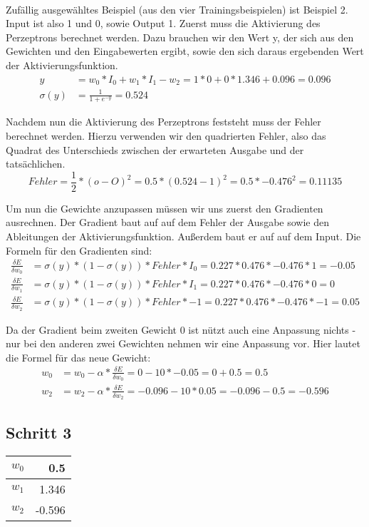 \documentclass[a4paper]{article}
\begin{document}
\paragraph{}
Zufällig ausgewähltes Beispiel (aus den vier Trainingsbeispielen) ist Beispiel 2. Input ist also 1 und 0, sowie Output 1.
Zuerst muss die Aktivierung des Perzeptrons berechnet werden. Dazu brauchen wir den Wert y, der sich aus den Gewichten und den Eingabewerten ergibt, sowie den sich daraus ergebenden Wert der Aktivierungsfunktion.
\begin{align*}
	y &= w_0 * I_0 + w_1 * I_1 - w_2 = 1 * 0 + 0 * 1.346 + 0.096 = 0.096 \\
	\sigma(y) &= \frac{1}{1 + e^{-y}} = 0.524
\end{align*}

Nachdem nun die Aktivierung des Perzeptrons feststeht muss der Fehler berechnet werden. Hierzu verwenden wir den quadrierten Fehler, also das Quadrat des Unterschieds zwischen der erwarteten Ausgabe und der tatsächlichen.
\[
	Fehler = \frac{1}{2} * (o - O)^2 = 0.5 * (0.524 - 1)^2 = 0.5 * -0.476^2 = 0.11135
\]

Um nun die Gewichte anzupassen müssen wir uns zuerst den Gradienten ausrechnen.
Der Gradient baut auf auf dem Fehler der Ausgabe sowie den Ableitungen der Aktivierungsfunktion. Außerdem baut er auf auf dem Input. Die Formeln für den Gradienten sind:
\begin{align*}
	\frac{\delta E}{\delta w_0} &= \sigma(y) * (1 - \sigma(y)) * Fehler * I_0 = 0.227 * 0.476 * -0.476 * 1 = -0.05 \\
	\frac{\delta E}{\delta w_1} &= \sigma(y) * (1 - \sigma(y)) * Fehler * I_1 = 0.227 * 0.476 * -0.476 * 0 = 0 \\
	\frac{\delta E}{\delta w_2} &= \sigma(y) * (1 - \sigma(y)) * Fehler * -1 = 0.227 * 0.476 * -0.476 * -1 = 0.05
\end{align*}

Da der Gradient beim zweiten Gewicht 0 ist nützt auch eine Anpassung nichts - nur bei den anderen zwei Gewichten nehmen wir eine Anpassung vor. Hier lautet die Formel für das neue Gewicht:
\begin{align*}
	w_0 &= w_0 - \alpha * \frac{\delta E}{\delta w_0} = 0 - 10 * -0.05 = 0 + 0.5 = 0.5 \\
	w_2 &= w_2 - \alpha * \frac{\delta E}{\delta w_2} = -0.096 - 10 * 0.05 = -0.096 - 0.5 = -0.596
\end{align*}

\subsection{Schritt 3}
\begin{tabular}{|l|r|}
	\hline
	$w_0$ & 0.5 \\\hline
	$w_1$ & 1.346 \\\hline
	$w_2$ & -0.596 \\\hline
\end{tabular}
\end{document}
